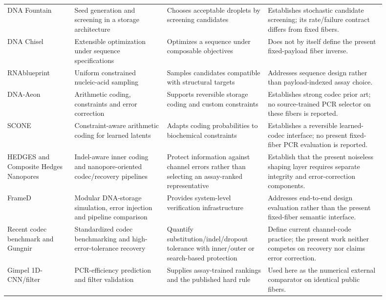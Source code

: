 \documentclass[10pt]{article}
\begin{document}
\begin{table}[H]
\begin{tabular}{>{\raggedright\arraybackslash}p{0.16\linewidth}>{\raggedright\arraybackslash}p{0.22\linewidth}>{\raggedright\arraybackslash}p{0.24\linewidth}>{\raggedright\arraybackslash}p{0.28\linewidth}}
DNA Fountain \cite{erlich2017dnafountain} & Seed generation and screening in a storage architecture & Chooses acceptable droplets by screening candidates & Establishes stochastic candidate screening; its rate/failure contract differs from fixed fibers. \\
DNA Chisel \cite{zulkower2020dnachisel} & Extensible optimization under sequence specifications & Optimizes a sequence under composable objectives & Does not by itself define the present fixed-payload fiber inverse. \\
RNAblueprint \cite{hammer2017rnablueprint} & Uniform constrained nucleic-acid sampling & Samples candidates compatible with structural targets & Addresses sequence design rather than payload-indexed assay choice. \\
DNA-Aeon \cite{welzel2023dnaaeon} & Arithmetic coding, constraints and error correction & Supports reversible storage coding and custom constraints & Establishes strong codec prior art; no source-trained PCR selector on these fibers is reported. \\
SCONE \cite{ruan2026scone} & Constraint-aware arithmetic coding for learned latents & Adapts coding probabilities to biochemical constraints & Establishes a reversible learned-codec interface; no present fixed-fiber PCR evaluation is reported. \\
HEDGES and Composite Hedges Nanopores \cite{press2020hedges,zhao2024compositehedges} & Indel-aware inner coding and nanopore-oriented codec/recovery pipelines & Protect information against channel errors rather than selecting an assay-ranked representative & Establish that the present noiseless shaping layer requires separate integrity and error-correction components. \\
FrameD \cite{volkel2023framed} & Modular DNA-storage simulation, error injection and pipeline comparison & Provides system-level verification infrastructure & Addresses end-to-end design evaluation rather than the present fixed-fiber semantic interface. \\
Recent codec benchmark and Gungnir \cite{gimpel2026codecbenchmark,zhang2026gungnir} & Standardized codec benchmarking and high-error-tolerance recovery & Quantify substitution/indel/dropout tolerance with inner/outer or search-based protection & Define current channel-code practice; the present work neither competes on recovery nor claims error correction. \\
Gimpel 1D-CNN/filter \cite{gimpel2025pcrbias} & PCR-efficiency prediction and filter validation & Supplies assay-trained rankings and the published hard rule & Used here as the numerical external comparator on identical public fibers. \\

\end{tabular}
\end{table}
\end{document}
